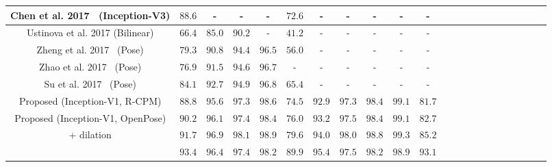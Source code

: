 \documentclass{llncs}
\begin{document}
\begin{table*}
\begin{tabular}{|Sl|| Sc|Sc|Sc|Sc|Sc|  Sc|Sc|Sc|Sc|Sc|}
Chen et al. 2017~\cite{conf/cvpr/chen17} (Inception-V3) & $88.6$ & - & - & - & $72.6$ & - & - & - & - & -\\
\hline
Ustinova et al. 2017 \cite{conf/avss/ustinova17} (Bilinear) & $66.4$ & $85.0$ & $90.2$ & - & $41.2$  & - & -& -& -& -\\
\hline
Zheng et al. 2017~\cite{ZhengHLY17} (Pose) & $79.3$ & $90.8$ & $94.4$ & $96.5$ & $56.0$  & -& -& -& -&-\\
Zhao et al. 2017~\cite{ZhaoTSSYYWT17} (Pose) & $76.9$ & $91.5$ & $94.6$ & $96.7$ & - & -& -& -& -& -\\
Su et al. 2017~\cite{SuLZXGT17} (Pose) & $84.1$ & $92.7$ & $94.9$ & $96.8$ & $65.4$ & - & - & - & - & -\\
\hline
Proposed (Inception-V1, R-CPM) &  $88.8$ & $95.6$ & $97.3$ &  $98.6$ & $74.5$ & $92.9$ & $97.3$ & $98.4$ & $99.1$ & $81.7$\\
Proposed (Inception-V1, OpenPose)& $\mathbf{90.2}$ & $\mathbf{96.1}$ & $\mathbf{97.4}$ & $\mathbf{98.4}$ & $\mathbf{76.0}$ & $\mathbf{93.2}$ & $\mathbf{97.5}$ & $\mathbf{98.4}$ & $\mathbf{99.1}$ & $\mathbf{82.7}$ \\
\quad\quad + dilation& $\mathbf{91.7}$ & $\mathbf{96.9}$ & $\mathbf{98.1}$ & $\mathbf{98.9}$ & $\mathbf{79.6}$ & $\mathbf{94.0}$ & $\mathbf{98.0}$ & $\mathbf{98.8}$ & $\mathbf{99.3}$ & $\mathbf{85.2}$\\
\quad{} & {\color{blue} $\mathbf{93.4}$} & {\color{blue} $\mathbf{96.4}$} & {\color{blue}$\mathbf{97.4}$} & {\color{blue} $\mathbf{98.2}$} & {\color{blue} $\mathbf{89.9}$} & {\color{blue} $\mathbf{95.4}$} &{\color{blue} $\mathbf{97.5}$} & {\color{blue} $\mathbf{98.2}$} & {\color{blue} $\mathbf{98.9}$} & {\color{blue} $\mathbf{93.1}$}\\
\hline
\end{tabular}\vspace{-.0cm}
\end{table*}
\end{document}
